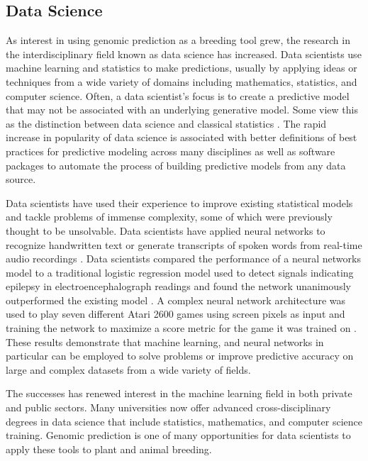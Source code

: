 \subsection*{Data Science}

As interest in using genomic prediction as a breeding tool grew, the research in 
the interdisciplinary field known as data science has increased. Data scientists 
use machine learning and statistics to make 
predictions, usually by applying ideas or techniques from a wide variety of domains 
including mathematics, statistics, and computer science. Often, a data scientist's focus is to
create a predictive model that may not be associated with an underlying generative model. 
Some view this as the distinction between data science and classical statistics 
\citep{donoho2015, breiman2001}. The rapid increase in popularity of data science
is associated with better definitions of best practices for predictive modeling
across many disciplines as well as software packages to automate the 
process of building predictive models from any data source.

Data scientists have used their experience to improve existing statistical 
models and tackle problems of immense complexity, some of which were previously 
thought to be unsolvable. Data scientists have applied neural networks to recognize 
handwritten text or generate transcripts of spoken words from real-time audio recordings \citep{lang1990}.
Data scientists compared the performance of a neural networks model to a traditional 
logistic regression model used to detect signals indicating epilepsy in electroencephalograph 
readings and found the network unanimously outperformed the existing model \citep{subasi2005}.
A complex neural network architecture was used to play seven different Atari 2600 
games using screen pixels as input and training the network to maximize a score metric 
for the game it was trained on \citep{mnih2013}. These results demonstrate that machine learning,
and neural networks in particular can be employed to solve problems or improve predictive accuracy
on large and complex datasets from a wide variety of fields.

The successes has renewed interest in the machine learning field in both
private and public sectors. Many universities now offer advanced cross-disciplinary
degrees in data science that include statistics, mathematics, and computer
science training. Genomic prediction is one of many opportunities for data scientists
to apply these tools to plant and animal breeding.

